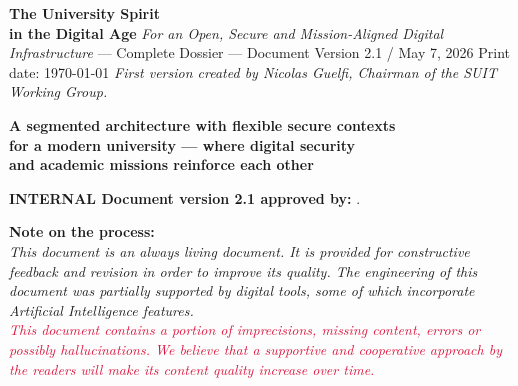 \documentclass[11pt,a4paper,twoside]{book}
\begin{document}
\hypersetup{pageanchor=false}
\begin{titlepage}
\centering
\vspace*{0.8cm}
{\Huge\bfseries The University Spirit\\[0.35cm]in the Digital Age}
\vspace{0.6cm}
{\LARGE\itshape For an Open, Secure and Mission-Aligned Digital Infrastructure}
\vspace{1cm}
{\large --- Complete Dossier ---}
\vspace{0.5cm}
{\large Document Version 2.1 / May 7, 2026}
\vspace{0.2cm}
{\normalsize Print date: \today}
\vspace{0.3cm}
{\small\itshape First version created by Nicolas Guelfi, Chairman of the SUIT Working Group.}
\vspace{0.5cm}
\begin{tcolorbox}[colback=NavyBlue!8!white,colframe=NavyBlue!85!black,boxrule=1.2pt,
    arc=3pt,left=12pt,right=12pt,top=8pt,bottom=8pt,width=0.88\textwidth,halign=center]
{\large\bfseries A segmented architecture with flexible secure contexts\\[4pt]
for a modern university --- where digital security\\[4pt]
and academic missions reinforce each other}
\end{tcolorbox}
\vspace{0.5cm}
{\small\noindent \textcolor{OliveGreen}{\textbf{INTERNAL Document version 2.1 approved by:} .}}\par
\vspace{0.3cm}
{\small\noindent \textbf{Note on the process:}\\
\textit{This document is an always living document.
It is provided for constructive feedback and revision in order to improve its quality.
The engineering of this document was partially supported by digital tools, some of which incorporate Artificial Intelligence features.}\\[3pt]
\textcolor{Crimson}{\textit{This document contains a portion of imprecisions, missing content, errors or possibly hallucinations. We believe that a supportive and cooperative approach by the readers will make its content quality increase over time.}}}\par
\vfill
\begin{tcolorbox}[colback=BrickRed!8!white,colframe=BrickRed!75!black,boxrule=1.2pt,
    arc=3pt,left=12pt,right=12pt,top=8pt,bottom=8pt,width=0.88\textwidth,halign=center]

\end{tcolorbox}
\end{titlepage}
\end{document}

